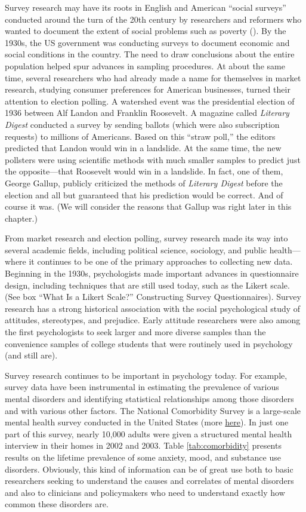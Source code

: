 \documentclass[
]{krantz}
\begin{document}
Survey research may have its roots in English and American ``social surveys'' conducted around the turn of the 20th century by researchers and reformers who wanted to document the extent of social problems such as poverty (). By the 1930s, the US government was conducting surveys to document economic and social conditions in the country. The need to draw conclusions about the entire population helped spur advances in sampling procedures. At about the same time, several researchers who had already made a name for themselves in market research, studying consumer preferences for American businesses, turned their attention to election polling. A watershed event was the presidential election of 1936 between Alf Landon and Franklin Roosevelt. A magazine called \emph{Literary Digest} conducted a survey by sending ballots (which were also subscription requests) to millions of Americans. Based on this ``straw poll,'' the editors predicted that Landon would win in a landslide. At the same time, the new pollsters were using scientific methods with much smaller samples to predict just the opposite---that Roosevelt would win in a landslide. In fact, one of them, George Gallup, publicly criticized the methods of \emph{Literary Digest} before the election and all but guaranteed that his prediction would be correct. And of course it was. (We will consider the reasons that Gallup was right later in this chapter.)

From market research and election polling, survey research made its way into several academic fields, including political science, sociology, and public health---where it continues to be one of the primary approaches to collecting new data. Beginning in the 1930s, psychologists made important advances in questionnaire design, including techniques that are still used today, such as the Likert scale. (See box ``What Is a Likert Scale?'' Constructing Survey Questionnaires). Survey research has a strong historical association with the social psychological study of attitudes, stereotypes, and prejudice. Early attitude researchers were also among the first psychologists to seek larger and more diverse samples than the convenience samples of college students that were routinely used in psychology (and still are).

Survey research continues to be important in psychology today. For example, survey data have been instrumental in estimating the prevalence of various mental disorders and identifying statistical relationships among those disorders and with various other factors. The National Comorbidity Survey is a large-scale mental health survey conducted in the United States (more \href{https://www.hcp.med.harvard.edu/ncs/}{here}). In just one part of this survey, nearly 10,000 adults were given a structured mental health interview in their homes in 2002 and 2003. Table \ref{tab:comorbidity} presents results on the lifetime prevalence of some anxiety, mood, and substance use disorders. Obviously, this kind of information can be of great use both to basic researchers seeking to understand the causes and correlates of mental disorders and also to clinicians and policymakers who need to understand exactly how common these disorders are.
\end{document}
